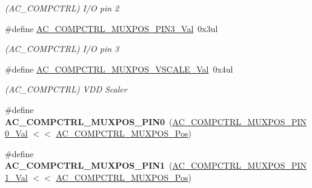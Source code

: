 \begin{DoxyCompactItemize}
\begin{DoxyCompactList}\small\item\em (A\+C\+\_\+\+C\+O\+M\+P\+C\+T\+R\+L) I/\+O pin 2 \end{DoxyCompactList}\item 
\hypertarget{group___s_a_m_l21___a_c_ga3fa0d80ee6e615fa69c31af219f66c4a}{}\#define \hyperlink{group___s_a_m_l21___a_c_ga3fa0d80ee6e615fa69c31af219f66c4a}{A\+C\+\_\+\+C\+O\+M\+P\+C\+T\+R\+L\+\_\+\+M\+U\+X\+P\+O\+S\+\_\+\+P\+I\+N3\+\_\+\+Val}~0x3ul\label{group___s_a_m_l21___a_c_ga3fa0d80ee6e615fa69c31af219f66c4a}

\begin{DoxyCompactList}\small\item\em (A\+C\+\_\+\+C\+O\+M\+P\+C\+T\+R\+L) I/\+O pin 3 \end{DoxyCompactList}\item 
\hypertarget{group___s_a_m_l21___a_c_ga4e6961d30aa8bf0ed3f905ac3169ebdf}{}\#define \hyperlink{group___s_a_m_l21___a_c_ga4e6961d30aa8bf0ed3f905ac3169ebdf}{A\+C\+\_\+\+C\+O\+M\+P\+C\+T\+R\+L\+\_\+\+M\+U\+X\+P\+O\+S\+\_\+\+V\+S\+C\+A\+L\+E\+\_\+\+Val}~0x4ul\label{group___s_a_m_l21___a_c_ga4e6961d30aa8bf0ed3f905ac3169ebdf}

\begin{DoxyCompactList}\small\item\em (A\+C\+\_\+\+C\+O\+M\+P\+C\+T\+R\+L) V\+D\+D Scaler \end{DoxyCompactList}\item 
\hypertarget{group___s_a_m_l21___a_c_gaa6940ace4f9f0c40daeebe2054d850e0}{}\#define {\bfseries A\+C\+\_\+\+C\+O\+M\+P\+C\+T\+R\+L\+\_\+\+M\+U\+X\+P\+O\+S\+\_\+\+P\+I\+N0}~(\hyperlink{group___s_a_m_l21___a_c_gaa1bfbd8fc89186f1a11a61237e80c4c5}{A\+C\+\_\+\+C\+O\+M\+P\+C\+T\+R\+L\+\_\+\+M\+U\+X\+P\+O\+S\+\_\+\+P\+I\+N0\+\_\+\+Val}   $<$$<$ \hyperlink{group___s_a_m_l21___a_c_gad4bb8c36791a0ea8139ae435b00e4365}{A\+C\+\_\+\+C\+O\+M\+P\+C\+T\+R\+L\+\_\+\+M\+U\+X\+P\+O\+S\+\_\+\+Pos})\label{group___s_a_m_l21___a_c_gaa6940ace4f9f0c40daeebe2054d850e0}

\item 
\hypertarget{group___s_a_m_l21___a_c_ga7e5ac8a0d0d3758e757bce450516ca83}{}\#define {\bfseries A\+C\+\_\+\+C\+O\+M\+P\+C\+T\+R\+L\+\_\+\+M\+U\+X\+P\+O\+S\+\_\+\+P\+I\+N1}~(\hyperlink{group___s_a_m_l21___a_c_ga9fb0459c9bcee7f1ecde923e57096492}{A\+C\+\_\+\+C\+O\+M\+P\+C\+T\+R\+L\+\_\+\+M\+U\+X\+P\+O\+S\+\_\+\+P\+I\+N1\+\_\+\+Val}   $<$$<$ \hyperlink{group___s_a_m_l21___a_c_gad4bb8c36791a0ea8139ae435b00e4365}{A\+C\+\_\+\+C\+O\+M\+P\+C\+T\+R\+L\+\_\+\+M\+U\+X\+P\+O\+S\+\_\+\+Pos})\label{group___s_a_m_l21___a_c_ga7e5ac8a0d0d3758e757bce450516ca83}


\end{DoxyCompactItemize}
